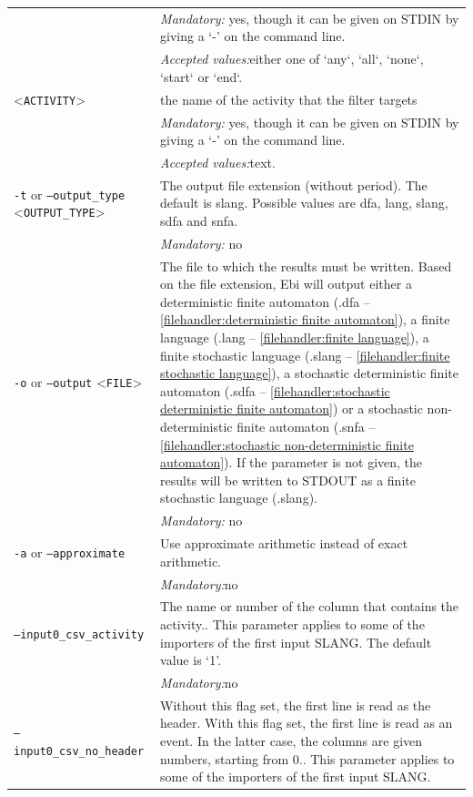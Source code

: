 {\begin{tabularx}{\linewidth}{lX}
&\textit{Mandatory:} \quad yes, though it can be given on STDIN by giving a `-' on the command line.\\
&\textit{Accepted values:}\quad either one of `any`, `all`, `none`, `start` or `end`.\\
<\texttt{ACTIVITY}>&the name of the activity that the filter targets\\
&\textit{Mandatory:} \quad yes, though it can be given on STDIN by giving a `-' on the command line.\\
&\textit{Accepted values:}\quad text.\\
\texttt{-t} or \texttt{--output\_type} <\texttt{OUTPUT\_TYPE}> &
The output file extension (without period). The default is slang. Possible values are dfa, lang, slang, sdfa and snfa.\\
&\textit{Mandatory:} \quad no\\
\texttt{-o} or \texttt{--output} <\texttt{FILE}> &
The file to which the results must be written. Based on the file extension, Ebi will output either a deterministic finite automaton (.dfa -- \cref{filehandler:deterministic finite automaton}), a finite language (.lang -- \cref{filehandler:finite language}), a finite stochastic language (.slang -- \cref{filehandler:finite stochastic language}), a stochastic deterministic finite automaton (.sdfa -- \cref{filehandler:stochastic deterministic finite automaton}) or a stochastic non-deterministic finite automaton (.snfa -- \cref{filehandler:stochastic non-deterministic finite automaton}).
If the parameter is not given, the results will be written to STDOUT as a finite stochastic language (.slang).\\
&\textit{Mandatory:} \quad no\\
\texttt{-a} or \texttt{--approximate} & Use approximate arithmetic instead of exact arithmetic.\\
&\textit{Mandatory:}\quad no\\
\texttt{--input0\_csv\_activity} & The name or number of the column that contains the activity.. This parameter applies to some of the importers of the first input SLANG. The default value is `1'.\\
&\textit{Mandatory:}\quad no\\
\texttt{--input0\_csv\_no\_header} & Without this flag set, the first line is read as the header. 
    With this flag set, the first line is read as an event. In the latter case, the columns are given numbers, starting from 0.. This parameter applies to some of the importers of the first input SLANG. \\

\end{tabularx}}

